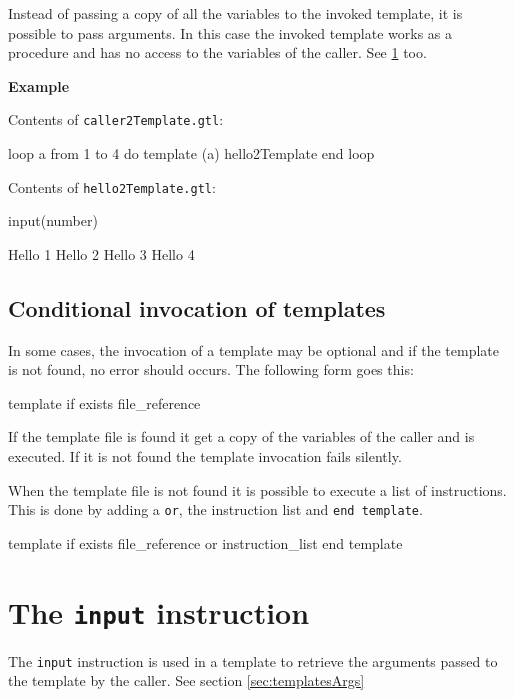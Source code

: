 \documentclass[10pt,openright,twosides]{report}
\newcommand{\gtlinline}[1]{\colorbox{light-blue}{\lstinline[language=gtl]{#1}}}
\newcommand{\example}{\vspace{.75em}\noindent\textbf{Example}\vspace{0em}}
\begin{document}
Instead of passing a copy of all the variables to the invoked template, it is possible to pass arguments. In this case the invoked template works as a procedure and has no access to the variables of the caller. See \ref{sec:input} too.

\example

\noindent Contents of \texttt{\small caller2Template.gtl}:
\begin{gtl}
loop a from 1 to 4 do
  template (a) hello2Template 
end loop
%
%
\end{gtl}
\noindent Contents of \texttt{\small hello2Template.gtl}:
\begin{gtl}
input(number)
\end{gtl}

\begin{templateoutput}
Hello 1 Hello 2 Hello 3 Hello 4 
\end{templateoutput}

\subsection{Conditional invocation of templates}

In some cases, the invocation of a template may be optional and if the template is not found, no error should occurs. The following form goes this:

\begin{gtl}
template if exists file_reference
\end{gtl}

If the template file is found it get a copy of the variables of the caller and is executed. If it is not found the template invocation fails silently.

When the template file is not found it is possible to execute a list of instructions. This is done by adding a \gtlinline{or}, the instruction list and \gtlinline{end template}.

\begin{gtl}
template if exists file_reference or
  instruction_list
end template
\end{gtl}

\section{The \texttt{input} instruction}
\label{sec:input}

The \gtlinline{input} instruction is used in a template to retrieve the arguments passed to the template by the caller. See section \ref{sec:templatesArgs}
\end{document}
